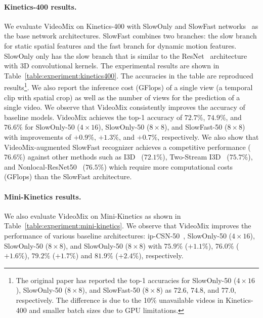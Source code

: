 \paragraph{Kinetics-400 results.}



We evaluate VideoMix on Kinetics-400 with SlowOnly and SlowFast networks~\cite{feichtenhofer2019slowfast} as the base network architectures.
SlowFast combines two branches: the slow branch for static spatial features and the fast branch for dynamic motion features.
SlowOnly only has the slow branch that is similar to the ResNet~\cite{resnet} architecture with 3D convolutional kernels.
The experimental results are shown in Table~\ref{table:experiment:kinetics400}.
The accuracies in the table are reproduced results\footnote{The original paper has reported the top-1 accuracies for {SlowOnly-50 ($4 \times 16$), SlowOnly-50 ($8 \times 8$), and SlowFast-50 ($8 \times 8$)} as $72.6$, $74.8$, and $77.0$, respectively. The difference is due to the 10\% unavailable videos in Kinetics-400 and smaller batch sizes due to GPU limitations.}.
We also report the inference cost (GFlops) of a single view (a temporal clip with spatial crop) as well as the number of views for the prediction of a single video.
We observe that VideoMix consistently improves the accuracy of baseline models. 
VideoMix achieves the top-1 accuracy of $72.7\%$, $74.9\%$, and $76.6\%$ for SlowOnly-50 ($4 \times 16$), SlowOnly-50 ($8 \times 8$), and SlowFast-50 ($8 \times 8$) with improvements of $+\mathbf{0.9}\%$, $+\mathbf{1.3}\%$, and $+\mathbf{0.7}\%$, respectively.
We also show that VideoMix-augmented SlowFast recognizer achieves a competitive performance ($76.6\%$) against other methods such as I3D~\cite{carreira2017quo} ($72.1\%$), Two-Stream I3D~\cite{carreira2017quo} ($75.7\%$), and Nonlocal-ResNet50~\cite{wang2018non} ($76.5\%$) which require more computational costs (GFlops) than the SlowFast architecture. 

\paragraph{Mini-Kinetics results.}



We also evaluate VideoMix on Mini-Kinetics as shown in Table~\ref{table:experiment:mini-kinetics}.
We observe that VideoMix improves the performance of various baseline architectures: ip-CSN-50~\cite{tran2019CSN}, SlowOnly-50 ($4\times16$), SlowOnly-50 ($8\times8$), and SlowOnly-50 ($8\times8$) with $\mathbf{75.9}\%$ ($\mathbf{+1.1}\%$), $\mathbf{76.0}\%$ ($\mathbf{+1.6}\%$), $\mathbf{79.2}\%$ ($\mathbf{+1.7}\%$) and $\mathbf{81.9}\%$ ($\mathbf{+2.4}\%$), respectively.








